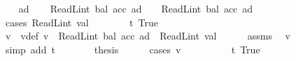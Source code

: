 \begin{isabellebody}
%
\isadelimproof
%
\endisadelimproof
%
\isatagproof
{}\isamarkupfalse%
\isanewline
\ \ \isamarkupfalse%
\ ad{\isacharprime}{\kern0pt}\isanewline
\ \ \isamarkupfalse%
\ {\isachardoublequoteopen}ReadL\isactrlsub i\isactrlsub n\isactrlsub t\ {\isacharparenleft}{\kern0pt}bal\ {\isacharparenleft}{\kern0pt}acc{\isacharprime}{\kern0pt}\ ad{\isacharprime}{\kern0pt}{\isacharparenright}{\kern0pt}{\isacharparenright}{\kern0pt}\ {\isasymge}\ {}\ {\isasymand}\ ReadL\isactrlsub i\isactrlsub n\isactrlsub t\ {\isacharparenleft}{\kern0pt}bal\ {\isacharparenleft}{\kern0pt}acc{\isacharprime}{\kern0pt}\ ad{\isacharprime}{\kern0pt}{\isacharparenright}{\kern0pt}{\isacharparenright}{\kern0pt}\ {\isacharless}{\kern0pt}\ {}\ {\isacharcircum}{\kern0pt}\ {}{}{}{\isachardoublequoteclose}\isanewline
\ \ \isamarkupfalse%
\ {\isacharparenleft}{\kern0pt}cases\ {\isachardoublequoteopen}ReadL\isactrlsub i\isactrlsub n\isactrlsub t\ val\ {\isasymge}\ {}{\isachardoublequoteclose}{\isacharparenright}{\kern0pt}\isanewline
\ \ \ \ \isamarkupfalse%
\ t{}{\isacharcolon}{\kern0pt}\ True\isanewline
\ \ \ \ \isamarkupfalse%
\ v\ \ v{\isacharunderscore}{\kern0pt}def{\isacharcolon}{\kern0pt}\ {\isachardoublequoteopen}v\ {\isacharequal}{\kern0pt}\ ReadL\isactrlsub i\isactrlsub n\isactrlsub t\ {\isacharparenleft}{\kern0pt}bal\ {\isacharparenleft}{\kern0pt}acc\ ad{\isacharparenright}{\kern0pt}{\isacharparenright}{\kern0pt}\ {\isacharplus}{\kern0pt}\ ReadL\isactrlsub i\isactrlsub n\isactrlsub t\ val{\isachardoublequoteclose}\isanewline
\ \ \ \ \isamarkupfalse%
\ assms{\isacharparenleft}{\kern0pt}{}{\isacharparenright}{\kern0pt}\ \isamarkupfalse%
\ {\isachardoublequoteopen}v\ {\isasymge}{}{\isachardoublequoteclose}\ \isamarkupfalse%
\ {\isacharparenleft}{\kern0pt}simp\ add{\isacharcolon}{\kern0pt}\ t{}{\isacharparenright}{\kern0pt}\isanewline
\ \ \ \ \isamarkupfalse%
\ \isamarkupfalse%
\ {\isacharquery}{\kern0pt}thesis\isanewline
\ \ \ \ \isamarkupfalse%
\ {\isacharparenleft}{\kern0pt}cases\ {\isachardoublequoteopen}v\ {\isacharless}{\kern0pt}\ {}{\isacharcircum}{\kern0pt}{}{}{}{\isachardoublequoteclose}{\isacharparenright}{\kern0pt}\isanewline
\ \ \ \ \ \ \isamarkupfalse%
\ t{}{\isacharcolon}{\kern0pt}\ True\isanewline

\end{isabellebody}

